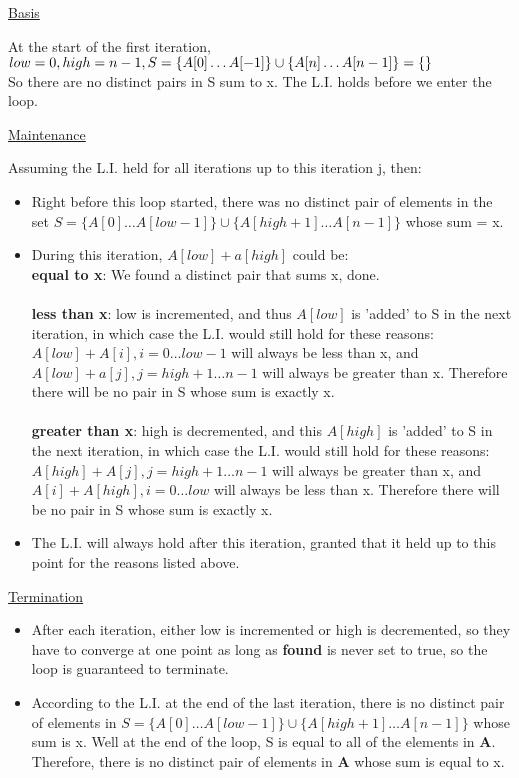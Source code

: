 \documentclass[a4paper,12pt]{article}
\begin{document}
\underline{Basis}
\begin{indentpar}{1cm}
  At the start of the first iteration,\\
  \(low = 0, high = n-1,\\ 
  S = \{A[0]\dots A[-1]\} \cup \{A[n] \dots A[n-1]\} = \{\}\)\\
  So there are no distinct pairs in S sum to x. The L.I. holds before we enter the loop.
\end{indentpar}
\underline{Maintenance}
\begin{indentpar}{1cm}
  Assuming the L.I. held for all iterations up to this iteration j, then:
  \begin{itemize}
    \item Right before this loop started, there was no distinct pair of elements in the set 
      \(S = \{A[0] \dots A[low-1]\} \cup \{A[high+1] \dots A[n-1]\}\) whose sum = x.
    \item During this iteration, \(A[low] + a[high]\) could be:\\
      {\bf equal to x}: We found a distinct pair that sums x, done.\\\\
      {\bf less than x}: low is incremented, and thus \(A[low]\) is 'added' to S in the next iteration, in which
      case the L.I. would still hold for these reasons: \(A[low] + A[i], i= 0 \dots low-1\) will always be less than
      x, and \(A[low] + a[j], j = high+1 \dots n-1\) will always be greater than x. Therefore there will be no pair in S
      whose sum is exactly x.\\\\
      {\bf greater than x}: high is decremented, and this \(A[high]\) is 'added' to S in the next iteration, in 
      which case the L.I. would still hold for these reasons: \(A[high] + A[j], j = high+1 \dots n-1\) will always
      be greater than x, and \(A[i] + A[high], i = 0 \dots low\) will always be less than x. Therefore there will be
      no pair in S whose sum is exactly x.
    \item The L.I. will always hold after this iteration, granted that it held up to this point for the reasons listed
      above.
  \end{itemize}
\underline{Termination}
\end{indentpar}
\begin{indentpar}{1cm}
  \begin{itemize}
    \item After each iteration, either low is incremented or high is decremented, so they have to converge at one
      point as long as {\bf found} is never set to true, so the loop is guaranteed to terminate.
    \item According to the L.I. at the end of the last iteration, there is no distinct pair of elements in 
      \(S = \{A[0] \dots A[low-1] \} \cup \{A[high+1] \dots A[n-1]\}\) whose sum is x. Well at the end of the loop,
      S is equal to all of the elements in {\bf A}. Therefore, there is no distinct pair of elements in {\bf A} whose
      sum is equal to x.
  \end{itemize}
\end{indentpar}
\end{document}
